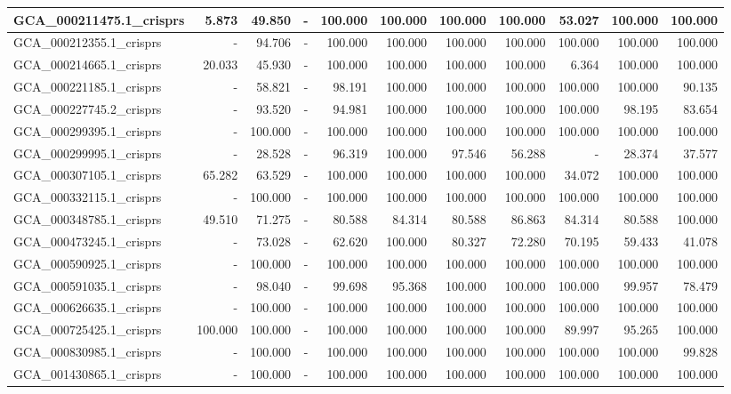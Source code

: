 \documentclass[12pt,a4paper]{article}
\begin{document}
\begin{table}[ht]
\begin{center}
\begin{tabular}{|l*{10}{|r}|}
GCA\_000211475.1\_crisprs & 5.873 & 49.850 & - & 100.000 & 100.000 & 100.000 & 100.000 & 53.027 & 100.000 & 100.000 \\ \hline
GCA\_000212355.1\_crisprs & - & 94.706 & - & 100.000 & 100.000 & 100.000 & 100.000 & 100.000 & 100.000 & 100.000 \\ \hline
GCA\_000214665.1\_crisprs & 20.033 & 45.930 & - & 100.000 & 100.000 & 100.000 & 100.000 & 6.364 & 100.000 & 100.000 \\ \hline
GCA\_000221185.1\_crisprs & - & 58.821 & - & 98.191 & 100.000 & 100.000 & 100.000 & 100.000 & 100.000 & 90.135 \\ \hline
GCA\_000227745.2\_crisprs & - & 93.520 & - & 94.981 & 100.000 & 100.000 & 100.000 & 100.000 & 98.195 & 83.654 \\ \hline
GCA\_000299395.1\_crisprs & - & 100.000 & - & 100.000 & 100.000 & 100.000 & 100.000 & 100.000 & 100.000 & 100.000 \\ \hline
GCA\_000299995.1\_crisprs & - & 28.528 & - & 96.319 & 100.000 & 97.546 & 56.288 & - & 28.374 & 37.577 \\ \hline
GCA\_000307105.1\_crisprs & 65.282 & 63.529 & - & 100.000 & 100.000 & 100.000 & 100.000 & 34.072 & 100.000 & 100.000 \\ \hline
GCA\_000332115.1\_crisprs & - & 100.000 & - & 100.000 & 100.000 & 100.000 & 100.000 & 100.000 & 100.000 & 100.000 \\ \hline
GCA\_000348785.1\_crisprs & 49.510 & 71.275 & - & 80.588 & 84.314 & 80.588 & 86.863 & 84.314 & 80.588 & 100.000 \\ \hline
GCA\_000473245.1\_crisprs & - & 73.028 & - & 62.620 & 100.000 & 80.327 & 72.280 & 70.195 & 59.433 & 41.078 \\ \hline
GCA\_000590925.1\_crisprs & - & 100.000 & - & 100.000 & 100.000 & 100.000 & 100.000 & 100.000 & 100.000 & 100.000 \\ \hline
GCA\_000591035.1\_crisprs & - & 98.040 & - & 99.698 & 95.368 & 100.000 & 100.000 & 100.000 & 99.957 & 78.479 \\ \hline
GCA\_000626635.1\_crisprs & - & 100.000 & - & 100.000 & 100.000 & 100.000 & 100.000 & 100.000 & 100.000 & 100.000 \\ \hline
GCA\_000725425.1\_crisprs & 100.000 & 100.000 & - & 100.000 & 100.000 & 100.000 & 100.000 & 89.997 & 95.265 & 100.000 \\ \hline
GCA\_000830985.1\_crisprs & - & 100.000 & - & 100.000 & 100.000 & 100.000 & 100.000 & 100.000 & 100.000 & 99.828 \\ \hline
GCA\_001430865.1\_crisprs & - & 100.000 & - & 100.000 & 100.000 & 100.000 & 100.000 & 100.000 & 100.000 & 100.000 \\ \hline
\end{tabular}
\end{center}
\end{table}
\end{document}
